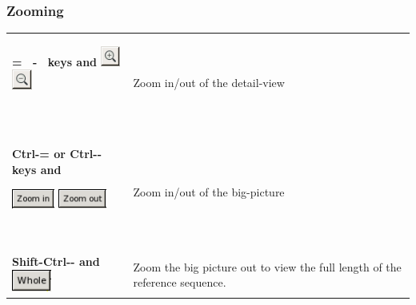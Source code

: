 \documentclass[letterpaper]{article}
\begin{document}
{\color[rgb]{0.30980393,0.5058824,0.7411765}\subsubsection[Zooming]{Zooming}}
\hypertarget{RefHeading1881056909880}{}\begin{flushleft}
\tablehead{}
\begin{supertabular}{p{4.801cm}p{9.729cm}}
{ \textbf{= \ {}- \ keys and }
\includegraphics[width=0.653cm,height=0.653cm]{img_button_zoom_in.png} 
\includegraphics[width=0.653cm,height=0.653cm]{img_button_zoom_out.png}
\textbf{ }}

~
 &
 Zoom in/out of the detail-view\\
{\bfseries Ctrl-= or Ctrl-{}- keys and}

 \includegraphics[width=1.404cm,height=0.635cm]{img_button_zoom_in_bp.png} 
\includegraphics[width=1.603cm,height=0.647cm]{img_button_zoom_out_bp.png} 

~
 &
 Zoom in/out of the big-picture\\
 \textbf{Shift-Ctrl-{}- and }
\includegraphics[width=1.289cm,height=0.723cm]{img_button_zoom_whole_bp.png} 
&
 Zoom the big picture out to view the full
length of the reference sequence.\\
\end{supertabular}
\end{flushleft}
\end{document}
